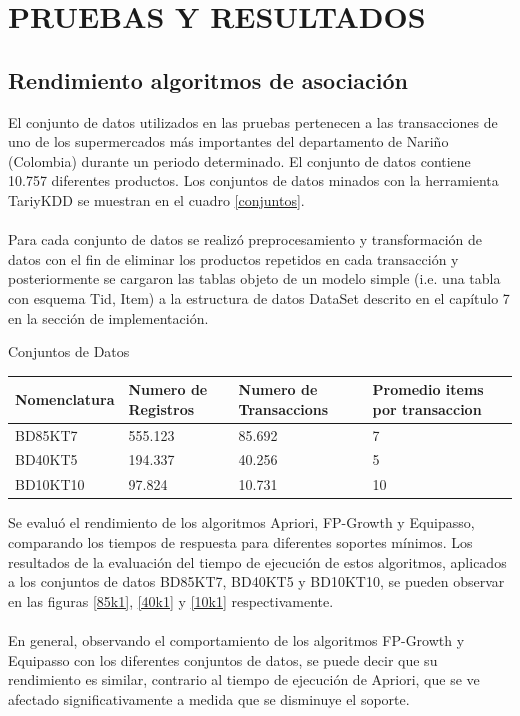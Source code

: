 \chapter{PRUEBAS Y RESULTADOS}
\section{Rendimiento algoritmos de asociaci\'on}

El conjunto de datos utilizados en las pruebas pertenecen a las transacciones de uno de los supermercados m\'as 
importantes del departamento de Nari\~no (Colombia) durante un periodo determinado. El conjunto de datos contiene 
10.757 diferentes productos. Los conjuntos de datos minados con la herramienta TariyKDD se muestran en el cuadro
\ref{conjuntos}.\\
\\
Para cada conjunto de datos se realiz\'o preprocesamiento y transformaci\'on de datos con el fin de eliminar los 
productos repetidos en cada transacci\'on y posteriormente se cargaron las tablas objeto de un modelo simple
(i.e. una tabla con esquema Tid, Item) a la estructura de datos DataSet descrito en el cap\'itulo 7 en la
secci\'on de implementaci\'on.\\

\begin{table}[h]
\caption{Conjuntos de Datos}
\label{conjuntos}
\end{table}
\begin{center}
\begin{tabular}{|p{30mm}|p{30mm}|p{30mm}|p{30mm}|}\hline
\textbf{Nomenclatura} & \textbf{Numero de Registros }& \textbf{Numero de Transaccions} & \textbf{Promedio items 
por transaccion} \\ \hline
BD85KT7 & 555.123 & 85.692 & 7 \\ \hline
BD40KT5 & 194.337 & 40.256 & 5 \\ \hline
BD10KT10 & 97.824 & 10.731 & 10 \\ \hline
\end{tabular}
\end{center}

Se evalu\'o el rendimiento de los algoritmos Apriori, FP-Growth y Equipasso, comparando los tiempos de respuesta 
para diferentes soportes m\'inimos. Los resultados de la evaluaci\'on del tiempo de ejecuci\'on de estos 
algoritmos, aplicados a los conjuntos de datos BD85KT7, BD40KT5 y BD10KT10, se pueden observar en las figuras
\ref{85k1}, \ref{40k1} y \ref{10k1} respectivamente.\\
\\
En general, observando el comportamiento de los algoritmos FP-Growth y Equipasso con los diferentes conjuntos de 
datos, se puede decir que su rendimiento es similar, contrario al tiempo de ejecuci\'on  de Apriori, que se ve 
afectado significativamente a medida que se disminuye el soporte.

